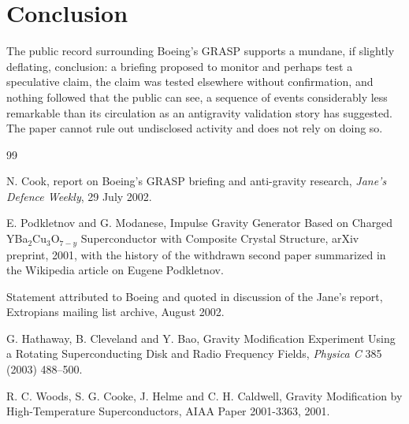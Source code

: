 \documentclass[11pt]{article}
\begin{document}
\section{Conclusion}

The public record surrounding Boeing's GRASP supports a mundane, if slightly deflating, conclusion: a briefing proposed to monitor and perhaps test a speculative claim, the claim was tested elsewhere without confirmation, and nothing followed that the public can see, a sequence of events considerably less remarkable than its circulation as an antigravity validation story has suggested. The paper cannot rule out undisclosed activity and does not rely on doing so.

\begin{thebibliography}{99}

 N. Cook, report on Boeing's GRASP briefing and anti-gravity research, \emph{Jane's Defence Weekly}, 29 July 2002.

 E. Podkletnov and G. Modanese, Impulse Gravity Generator Based on Charged YBa$_2$Cu$_3$O$_{7-y}$ Superconductor with Composite Crystal Structure, arXiv preprint, 2001, with the history of the withdrawn second paper summarized in the Wikipedia article on Eugene Podkletnov.

 Statement attributed to Boeing and quoted in discussion of the Jane's report, Extropians mailing list archive, August 2002.

 G. Hathaway, B. Cleveland and Y. Bao, Gravity Modification Experiment Using a Rotating Superconducting Disk and Radio Frequency Fields, \emph{Physica C} 385 (2003) 488--500.

 R. C. Woods, S. G. Cooke, J. Helme and C. H. Caldwell, Gravity Modification by High-Temperature Superconductors, AIAA Paper 2001-3363, 2001.

\end{thebibliography}
\end{document}

